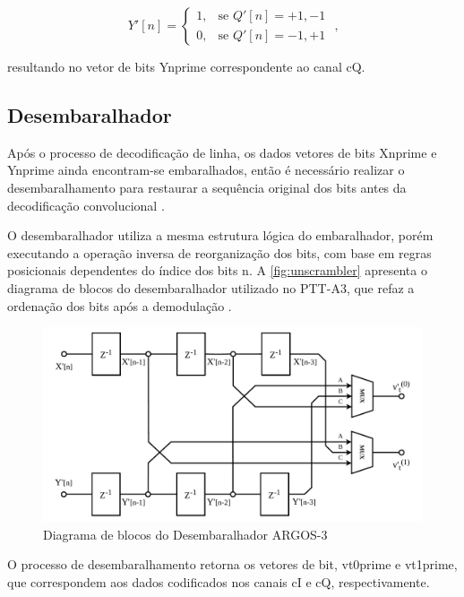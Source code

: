 \begin{equation}
    Y'[n] = 
    \begin{cases}
    1, & \text{se } Q'[n] = +1,-1 \\
    0, & \text{se } Q'[n] = -1,+1
    \end{cases} \text{ ,}
\end{equation}

\noindent resultando no vetor de bits \gls{Ynprime} correspondente ao canal \gls{cQ}. 

\subsection{Desembaralhador}

Após o processo de decodificação de linha, os dados vetores de bits \gls{Xnprime} e \gls{Ynprime} ainda encontram-se embaralhados, então é necessário realizar o desembaralhamento para restaurar a sequência original dos bits antes da decodificação convolucional \cite{cnes_services_and_message_formats_ed2_rev2_2006}.

O desembaralhador utiliza a mesma estrutura lógica do embaralhador, porém executando a operação inversa de reorganização dos bits, com base em regras posicionais dependentes do índice dos bits \gls{n}. A \autoref{fig:unscrambler} apresenta o diagrama de blocos do desembaralhador utilizado no \gls{PTT-A3}, que refaz a ordenação dos bits após a demodulação \cite{rodrigues_demodulador_2018}.

\begin{figure}[H]
\centering
\caption{Diagrama de blocos do Desembaralhador ARGOS-3}\label{fig:unscrambler}
\includegraphics[width=\linewidth]{assets/cap2/unscrambler.pdf}
\end{figure}

O processo de desembaralhamento retorna os vetores de bit, \gls{vt0prime} e \gls{vt1prime}, que correspondem aos dados codificados nos canais \gls{cI} e \gls{cQ}, respectivamente.

